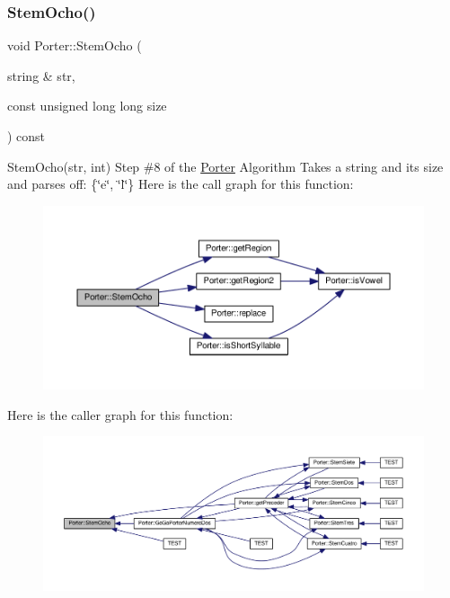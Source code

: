 \subsubsection{\texorpdfstring{Stem\+Ocho()}{StemOcho()}}
{\footnotesize\ttfamily void Porter\+::\+Stem\+Ocho (\begin{DoxyParamCaption}\item[{string \&}]{str,  }\item[{const unsigned long long}]{size }\end{DoxyParamCaption}) const}

Stem\+Ocho(str, int) Step \#8 of the \hyperlink{class_porter}{Porter} Algorithm Takes a string and its size and parses off\+: \{\char`\"{}e\char`\"{}, \char`\"{}l\char`\"{}\} Here is the call graph for this function\+:
\nopagebreak
\begin{figure}[H]
\begin{center}
\leavevmode
\includegraphics[width=350pt]{class_porter_a61853073641e47863fc6a85c786d8737_cgraph}
\end{center}
\end{figure}
Here is the caller graph for this function\+:
\nopagebreak
\begin{figure}[H]
\begin{center}
\leavevmode
\includegraphics[width=350pt]{class_porter_a61853073641e47863fc6a85c786d8737_icgraph}
\end{center}
\end{figure}
\mbox{\label{class_porter_a485f69d6797fce65144e0596f3190c2d}} 
